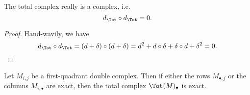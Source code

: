 \documentclass[main.tex]{subfiles}
\begin{document}
\begin{lemma}
  \label{lemma:total_complex_is_complex}
  The total complex really is a complex, i.e.
  \begin{equation*}
    d_{\Tot} \circ d_{\Tot} = 0.
  \end{equation*}
\end{lemma}
\begin{proof}
  Hand-wavily, we have
  \begin{equation*}
    d_{\Tot} \circ d_{\Tot} = (d + \delta) \circ (d + \delta) = d^{2} + d \circ \delta + \delta \circ d + \delta^{2} = 0.
  \end{equation*}
\end{proof}

\begin{theorem}
  \label{thm:conditions_total_complex_exact}
  Let $M_{i,j}$ be a first-quadrant double complex. Then if either the rows $M_{\bullet, j}$ or the columns $M_{i, \bullet}$ are exact, then the total complex $\Tot(M)_{\bullet}$ is exact.
\end{theorem}
\end{document}
